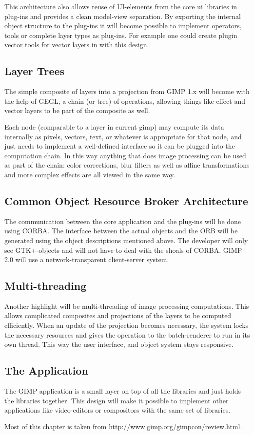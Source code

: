 This architecture also allows reuse of UI-elements from the core ui libraries
in plug-ins and provides a clean model-view separation. By exporting the
internal object structure to the plug-ins it will become possible to implement
operators, tools or complete layer types as plug-ins. For example one could
create plugin vector tools for vector layers in with this design.

\subsection{Layer Trees}
 
The simple composite of layers into a projection from GIMP 1.x will become with
the help of GEGL, a chain (or tree) of operations, allowing things like effect
and vector layers to be part of the composite as well. 

Each node (comparable to a layer in current gimp) may compute its data
internally as pixels, vectors, text, or whatever is appropriate for that node,
and  just needs to implement a well-defined interface so it can be plugged into
the computation chain. In this way anything that does image processing
can be used as part of the chain: color corrections, blur filters as well as
affine transformations and more complex effects are all viewed in 
the same way.

\subsection{Common Object Resource Broker Architecture}

The communication between the core application and the plug-ins will be done
using CORBA. The interface between the actual objects and the ORB will be
generated using the object descriptions mentioned above. The developer will
only see GTK+-objects and will not have to deal with the shoals of CORBA.  GIMP
2.0 will use a network-transparent client-server system.

\subsection{Multi-threading}

Another highlight will be multi-threading of image processing computations.
This allows complicated composites and projections of the layers to be computed
efficiently. When an update of the projection becomes necessary, the system
locks the necessary resources and gives the operation to the batch-renderer to
run in its own thread. This way the user interface, and object system stays
responsive.

\subsection{The Application}
The GIMP application is a small layer on top of all the libraries and just
holds the libraries together.  This design will make it possible to implement
other applications like video-editors or compositors with the same set of
libraries.

Most of this chapter is taken from http://www.gimp.org/gimpcon/review.html.
 

